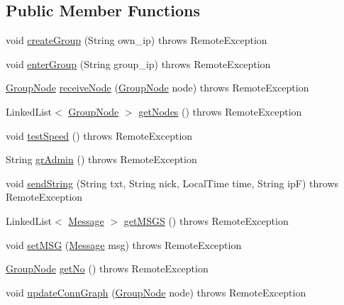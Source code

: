 \subsection*{Public Member Functions}
\begin{DoxyCompactItemize}
\item 
void \hyperlink{interfaceserver_1_1_broadcast_a1a8d1242a9c00acd3347ae64debe214d}{create\+Group} (String own\+\_\+ip)  throws Remote\+Exception
\item 
void \hyperlink{interfaceserver_1_1_broadcast_a6ccaeae4c0aae1a20f1dc0c9de38abf8}{enter\+Group} (String group\+\_\+ip)  throws Remote\+Exception
\item 
\hyperlink{classstructure_1_1_group_node}{Group\+Node} \hyperlink{interfaceserver_1_1_broadcast_aac507ae95810ae722d7d204e5f0b5762}{receive\+Node} (\hyperlink{classstructure_1_1_group_node}{Group\+Node} node)  throws Remote\+Exception
\item 
Linked\+List$<$ \hyperlink{classstructure_1_1_group_node}{Group\+Node} $>$ \hyperlink{interfaceserver_1_1_broadcast_af8619fab19094de9cbc3e0b4d34eca7e}{get\+Nodes} ()  throws Remote\+Exception
\item 
void \hyperlink{interfaceserver_1_1_broadcast_a1fe00d7724fded04758454fcd1e61615}{test\+Speed} ()  throws Remote\+Exception
\item 
String \hyperlink{interfaceserver_1_1_broadcast_ad17b53d0030a03ab8262ec9c94d19cdb}{gr\+Admin} ()  throws Remote\+Exception
\item 
void \hyperlink{interfaceserver_1_1_broadcast_aaad069086f243e7b256e732a65f78763}{send\+String} (String txt, String nick, Local\+Time time, String ipF)  throws Remote\+Exception
\item 
Linked\+List$<$ \hyperlink{classstructure_1_1_message}{Message} $>$ \hyperlink{interfaceserver_1_1_broadcast_ada7537c3ca6e9d8361c7194b2a3b6e7d}{get\+M\+S\+GS} ()  throws Remote\+Exception
\item 
void \hyperlink{interfaceserver_1_1_broadcast_a96f8dad32733e1d5e503435c11e324af}{set\+M\+SG} (\hyperlink{classstructure_1_1_message}{Message} msg)  throws Remote\+Exception
\item 
\hyperlink{classstructure_1_1_group_node}{Group\+Node} \hyperlink{interfaceserver_1_1_broadcast_a16bd97cd54313805b23cb7e2255a66a6}{get\+No} ()  throws Remote\+Exception
\item 
void \hyperlink{interfaceserver_1_1_broadcast_a9efddebebb91a7da6bc0ecddcc7a32e6}{update\+Conn\+Graph} (\hyperlink{classstructure_1_1_group_node}{Group\+Node} node)  throws Remote\+Exception
\end{DoxyCompactItemize}



